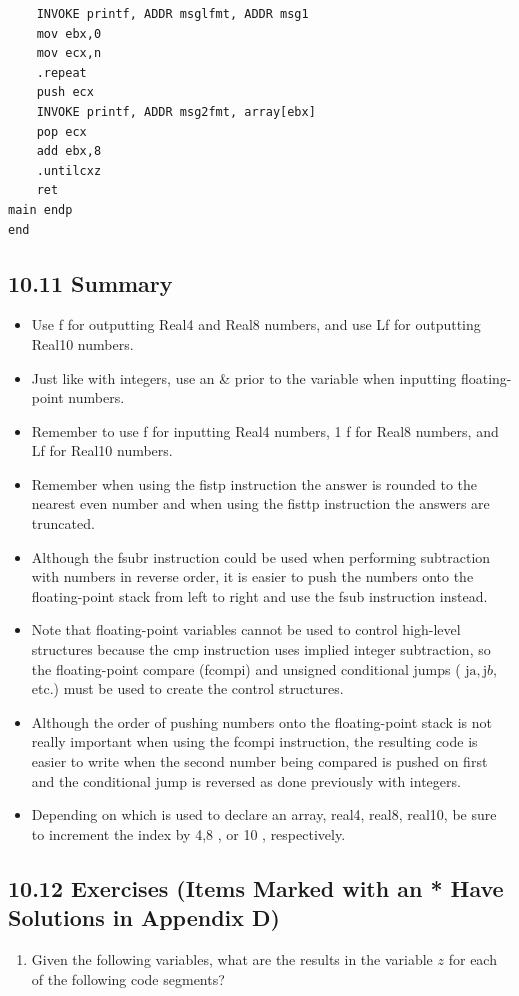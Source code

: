 \documentclass[10pt]{book}
\begin{document}
\begin{center}
\begin{center}
\begin{center}
\begin{center}
\begin{verbatim}
    INVOKE printf, ADDR msglfmt, ADDR msg1
    mov ebx,0
    mov ecx,n
    .repeat
    push ecx
    INVOKE printf, ADDR msg2fmt, array[ebx]
    pop ecx
    add ebx,8
    .untilcxz
    ret
main endp
end
\end{verbatim}

\subsection*{10.11 Summary}
\begin{itemize}
  \item Use f for outputting Real4 and Real8 numbers, and use Lf for outputting Real10 numbers.
  \item Just like with integers, use an \& prior to the variable when inputting floating-point numbers.
  \item Remember to use f for inputting Real4 numbers, 1 f for Real8 numbers, and Lf for Real10 numbers.
  \item Remember when using the fistp instruction the answer is rounded to the nearest even number and when using the fisttp instruction the answers are truncated.
  \item Although the fsubr instruction could be used when performing subtraction with numbers in reverse order, it is easier to push the numbers onto the floating-point stack from left to right and use the fsub instruction instead.
  \item Note that floating-point variables cannot be used to control high-level structures because the cmp instruction uses implied integer subtraction, so the floating-point compare (fcompi) and unsigned conditional jumps ( $\mathrm{ja}, \mathrm{j} b$, etc.) must be used to create the control structures.
  \item Although the order of pushing numbers onto the floating-point stack is not really important when using the fcompi instruction, the resulting code is easier to write when the second number being compared is pushed on first and the conditional jump is reversed as done previously with integers.
  \item Depending on which is used to declare an array, real4, real8, real10, be sure to increment the index by 4,8 , or 10 , respectively.
\end{itemize}

\subsection*{10.12 Exercises (Items Marked with an * Have Solutions in Appendix D)}
\begin{enumerate}
  \item Given the following variables, what are the results in the variable $z$ for each of the following code segments?
\end{enumerate}



\end{center}
\end{center}
\end{center}
\end{center}
\end{document}
